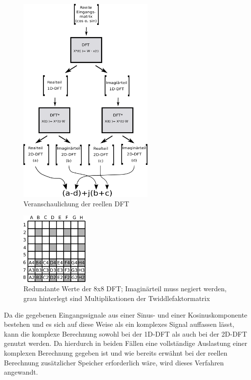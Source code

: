 \begin{figure}[htbp]
 \centering
 \includegraphics[width=0.6\textwidth]{img/reelleMatMult.png}
 \caption{Veranschaulichung der reellen DFT}
 \label{pic:reelleDFT}
\end{figure}


\begin{figure}[htbp]
 \centering
 \includegraphics[width=0.3\textwidth]{img/reelleMatMultRedundanz.png}
 \caption{Redundante Werte der 8x8 DFT; Imaginärteil muss negiert werden, grau hinterlegt sind Multiplikationen der Twiddlefaktormatrix}
 \label{pic:reelleMatMultRedundanz}
\end{figure}




Da die gegebenen Eingangssignale aus einer Sinus- und einer Kosinuskomponente bestehen und es sich auf diese Weise als ein komplexes Signal auffassen lässt, kann die 
komplexe Berechnung sowohl bei der 1D-DFT als auch bei der 2D-DFT genutzt werden. 
Da hierdurch in beiden Fällen eine vollständige Auslastung einer komplexen Berechnung gegeben ist und wie bereits erwähnt bei der reellen Berechnung zusätzlicher Speicher 
erforderlich wäre, wird dieses Verfahren angewandt.




